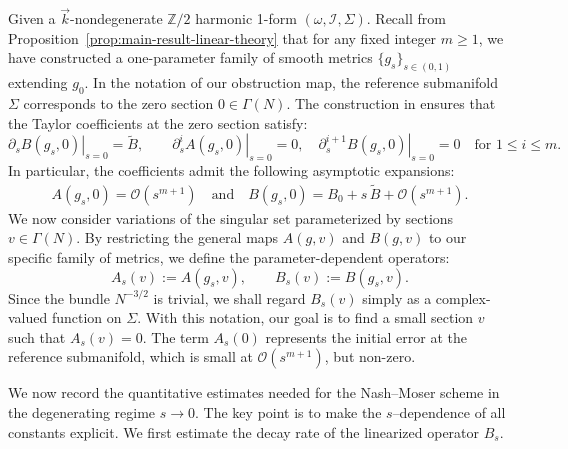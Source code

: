 \documentclass[11pt]{amsart}
\newcommand{\ZT}{\mathbb{Z}/2}
\newcommand{\MI}{\mathcal{I}}
\begin{document}
Given a $\vec{k}$-nondegenerate $\ZT$ harmonic 1-form $(\omega,\MI,\Sigma)$. Recall from Proposition~\ref{prop:main-result-linear-theory} that for any fixed integer $m\ge 1$, we have constructed a one-parameter family of smooth metrics $\{g_s\}_{s\in(0,1)}$ extending $g_0$. In the notation of our obstruction map, the reference submanifold $\Sigma$ corresponds to the zero section $0 \in \Gamma(N)$. The construction in  ensures that the Taylor coefficients at the zero section satisfy:
\begin{equation}
	\label{eq_taylor_expansion_label_m}
	\left.\partial_s B(g_s, 0)\right|_{s=0}=\widetilde B,
	\qquad
	\left.\partial_s^i A(g_s, 0)\right|_{s=0}=0,\quad \left.\partial_s^{i+1}B(g_s, 0)\right|_{s=0}=0 \quad \text{for } 1\le i\le m.
\end{equation}
In particular, the coefficients admit the following asymptotic expansions:
\begin{align*}
	A(g_s, 0) = \mathcal{O}(s^{m+1}) \quad \text{and} \quad
	B(g_s, 0) = B_0 + s \,\widetilde B + \mathcal{O}(s^{m+1}).
\end{align*}
We now consider variations of the singular set parameterized by sections $v \in \Gamma(N)$. By restricting the general maps $A(g, v)$ and $B(g, v)$ to our specific family of metrics, we define the parameter-dependent operators:
\[
A_s(v) := A(g_s, v), \qquad B_s(v) := B(g_s, v).
\]
Since the bundle $N^{-3/2}$ is trivial, we shall regard $B_s(v)$ simply as a complex-valued function on $\Sigma$. With this notation, our goal is to find a small section $v$ such that $A_s(v)=0$. The term $A_s(0)$ represents the initial error at the reference submanifold, which is small at $\mathcal{O}(s^{m+1})$, but non-zero.

We now record the quantitative estimates needed for the Nash--Moser scheme in the degenerating
regime $s\to 0$. The key point is to make the $s$--dependence of all constants explicit.
We first estimate the decay rate of the linearized operator $B_s$.
\end{document}
